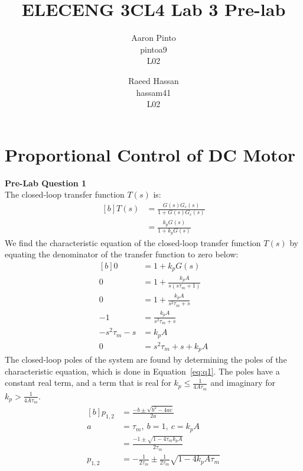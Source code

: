 \documentclass[12pt]{article}
\title{ELECENG 3CL4 Lab 3 Pre-lab}
\author{
    Aaron Pinto \\
    pintoa9 \\
    L02
    \and
    Raeed Hassan \\
    hassam41 \\
    L02
}
\begin{document}
\maketitle
\clearpage

\section{Proportional Control of DC Motor}
\textbf{Pre-Lab Question 1} \\
The closed-loop transfer function $T(s)$ is:
\begin{equation*}
\begin{aligned}[b]
    T(s) &= \frac{G(s)G_c(s)}{1 + G(s)G_c(s)} \\
    &= \frac{k_pG(s)}{1 + k_pG(s)}
\end{aligned}
\end{equation*}
We find the characteristic equation of the closed-loop transfer function $T(s)$ by equating the denominator of the transfer function to zero below: 
\begin{equation*}
\begin{aligned}[b]
    0 &= 1 + k_pG(s) \\
    0 &= 1 + \frac{k_pA}{s(s\tau_m + 1)} \\
    0 &= 1 + \frac{k_pA}{s^2\tau_m + s} \\
    -1 &= \frac{k_pA}{s^2\tau_m + s} \\
    -s^2\tau_m - s &= k_pA \\
    0 &= s^2\tau_m + s + k_pA
\end{aligned}
\end{equation*}
The closed-loop poles of the system are found by determining the poles of the characteristic equation, which is done in Equation~\ref{eq:q1}. The poles have a constant real term, and a term that is real for $k_p \leq \frac{1}{4A\tau_m}$ and imaginary for $k_p > \frac{1}{4A\tau_m}$. 
\begin{equation} \label{eq:q1}
\begin{aligned}[b]
    p_{1,2} &= \frac{-b \pm \sqrt{b^2 - 4ac}}{2a} \\
    a &= \tau_m, \ b = 1, \ c = k_pA \\
    &= \frac{-1 \pm \sqrt{1 - 4\tau_m k_p A}}{2\tau_m} \\
    p_{1,2} &= -\frac{1}{2\tau_m} \pm \frac{1}{2\tau_m}\sqrt{1 - 4k_p A \tau_m}
\end{aligned}
\end{equation}
\end{document}
